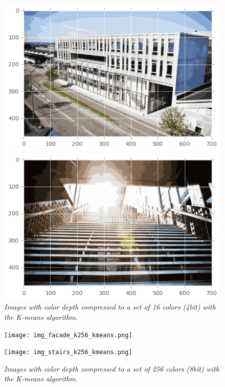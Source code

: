 \documentclass[a4paper,10pt,article,oneside,english]{memoir}
\let\oldcaption\caption
\renewcommand{\caption}[1]{\oldcaption{\emph{#1}}}
\begin{document}
\begin{figure}
	\centering
	\begin{minipage}{.49\textwidth}
		\includegraphics[width=\textwidth]{img_facade_k16_kmeans.png}
	\end{minipage}
	\hfill
	\begin{minipage}{.49\textwidth}
		\includegraphics[width=\textwidth]{img_stairs_k16d_kmeans.png}
	\end{minipage}
	\caption{Images with color depth compressed to a set of 16 colors (4bit) with the K-means algorithm.}
	\label{fig:comp16}
\end{figure}

\begin{figure}
	\centering
	\begin{minipage}{.49\textwidth}
		\texttt{[image: img\_facade\_k256\_kmeans.png]}
	\end{minipage}
	\hfill
	\begin{minipage}{.49\textwidth}
		\texttt{[image: img\_stairs\_k256\_kmeans.png]}
	\end{minipage}
	\caption{Images with color depth compressed to a set of 256 colors (8bit) with the K-means algorithm.}
	\label{fig:comp256}
\end{figure}
\end{document}
